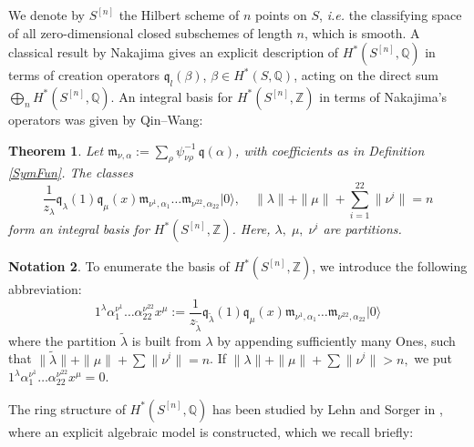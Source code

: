 \documentclass{amsart}
\newcommand{\hilb}[1]{^{[#1]}}
\newcommand{\ie}{{\it i.e. }}
\newcommand{\vac}{|0\rangle}
\newcommand{\One}{1}
\newcommand{\IQ}{\mathbb{Q}}
\newcommand{\IZ}{\mathbb{Z}}
\newcommand{\km}{\mathfrak{m}}
\newcommand{\kq}{\mathfrak{q}}
\theoremstyle{plain}
\newtheorem{theorem}{Theorem}[section]
\theoremstyle{definition}
\newtheorem{notation}[theorem]{Notation}
\theoremstyle{remark}
\begin{document}
We denote by $S\hilb{n}$ the Hilbert scheme of $n$ points on $S$, \ie the classifying space of all zero-dimensional closed subschemes of length $n$, which is smooth. 
A classical result by Nakajima gives an explicit description of $H^\ast(S\hilb{n},\IQ)$ in terms of creation operators
$\kq_l(\beta)$, 
$\beta\in H^\ast(S,\IQ)$, acting on the direct sum 
$\bigoplus_n H^\ast(S\hilb{n},\IQ)$. 
An integral basis for $H^\ast(S\hilb{n},\IZ)$ in terms of Nakajima's operators was given by Qin--Wang:
\begin{theorem} \cite[Thm. 5.4.]{QinWang} Let $\km_{\nu,\alpha} := \sum_\rho \psi_{\nu\rho}^{-1}\,\kq(\alpha)$, with coefficients as in Definition \ref{SymFun}. The classes
$$ \frac{1}{z_\lambda} \kq_\lambda(1)\kq_\mu(x)\km_{\nu^1,\alpha_1}\ldots\km_{\nu^{22},\alpha_{22}}\vac,\quad \|\lambda\| +\|\mu\| + \sum_{i=1}^{22}\|\nu^i\| = n
$$ 
form an integral basis for $H^\ast(S\hilb{n},\IZ)$. Here,
$\lambda,\; \mu,\; \nu^i$ are partitions.
\end{theorem}
\begin{notation}
To enumerate the basis of $H^\ast(S\hilb{n},\IZ)$, we introduce the following abbreviation:
$$ 
\One^\lambda \alpha_1^{\nu^1}\ldots\alpha_{22}^{\nu^{22}}x^\mu :=
\frac{1}{z_{\tilde{\lambda}} }
\kq_{\tilde{\lambda}}(\One)\kq_\mu(x)\km_{\nu^1,\alpha_1}\ldots\km_{\nu^{22},\alpha_{22}}\vac
$$
where the partition $\tilde{\lambda}$ is built from $\lambda$ by appending sufficiently many Ones, such that $\|\tilde{\lambda}\| +\|\mu\| + \sum\|\nu^i\| = n $. If $\|\lambda\| +\|\mu\| + \sum\|\nu^i\| > n, $ we put $\One^\lambda \alpha_1^{\nu^1}\ldots\alpha_{22}^{\nu^{22}}x^\mu =0$.
\end{notation}
The ring structure of $H^\ast(S\hilb{n}, \IQ)$ has been studied by Lehn and Sorger in \cite{LehnSorger}, where an explicit algebraic model is constructed, which we recall briefly:
\end{document}
